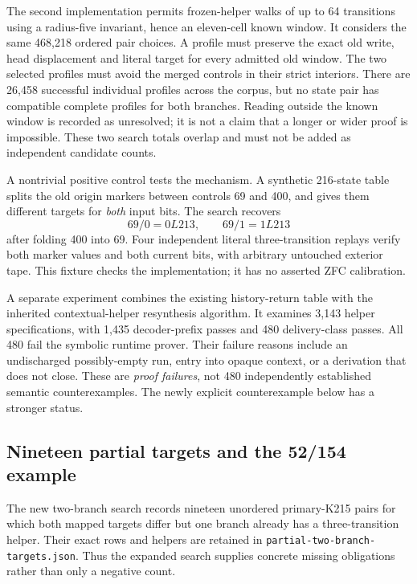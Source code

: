 The second implementation permits frozen-helper walks of up to 64 transitions using a radius-five invariant, hence an eleven-cell known window. It considers the same 468,218 ordered pair choices. A profile must preserve the exact old write, head displacement and literal target for every admitted old window. The two selected profiles must avoid the merged controls in their strict interiors. There are 26,458 successful individual profiles across the corpus, but no state pair has compatible complete profiles for both branches. Reading outside the known window is recorded as unresolved; it is not a claim that a longer or wider proof is impossible. These two search totals overlap and must not be added as independent candidate counts.

A nontrivial positive control tests the mechanism. A synthetic 216-state table splits the old origin markers between controls 69 and 400, and gives them different targets for \emph{both} input bits. The search recovers
\[
 69/0=0L213,\qquad69/1=1L213
\]
after folding 400 into 69. Four independent literal three-transition replays verify both marker values and both current bits, with arbitrary untouched exterior tape. This fixture checks the implementation; it has no asserted ZFC calibration.

A separate experiment combines the existing history-return table with the inherited contextual-helper resynthesis algorithm. It examines 3,143 helper specifications, with 1,435 decoder-prefix passes and 480 delivery-class passes. All 480 fail the symbolic runtime prover. Their failure reasons include an undischarged possibly-empty run, entry into opaque context, or a derivation that does not close. These are \emph{proof failures}, not 480 independently established semantic counterexamples. The newly explicit counterexample below has a stronger status.

\subsection{Nineteen partial targets and the 52/154 example}

The new two-branch search records nineteen unordered primary-K215 pairs for which both mapped targets differ but one branch already has a three-transition helper. Their exact rows and helpers are retained in \texttt{partial-two-branch-targets.json}. Thus the expanded search supplies concrete missing obligations rather than only a negative count.

